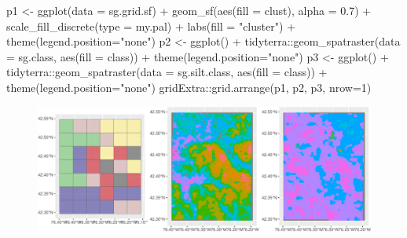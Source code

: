 \documentclass[
  letterpaper,
  DIV=11,
  numbers=noendperiod]{scrartcl}
\newenvironment{Shaded}{\begin{snugshade}}{\end{snugshade}}
\newcommand{\AttributeTok}[1]{\textcolor[rgb]{0.40,0.45,0.13}{#1}}
\newcommand{\DecValTok}[1]{\textcolor[rgb]{0.68,0.00,0.00}{#1}}
\newcommand{\FloatTok}[1]{\textcolor[rgb]{0.68,0.00,0.00}{#1}}
\newcommand{\FunctionTok}[1]{\textcolor[rgb]{0.28,0.35,0.67}{#1}}
\newcommand{\NormalTok}[1]{\textcolor[rgb]{0.00,0.23,0.31}{#1}}
\newcommand{\OtherTok}[1]{\textcolor[rgb]{0.00,0.23,0.31}{#1}}
\newcommand{\SpecialCharTok}[1]{\textcolor[rgb]{0.37,0.37,0.37}{#1}}
\newcommand{\StringTok}[1]{\textcolor[rgb]{0.13,0.47,0.30}{#1}}
\begin{document}
\begin{Shaded}
\begin{Highlighting}[]
\NormalTok{p1 }\OtherTok{\textless{}{-}} \FunctionTok{ggplot}\NormalTok{(}\AttributeTok{data =}\NormalTok{ sg.grid.sf) }\SpecialCharTok{+} 
  \FunctionTok{geom\_sf}\NormalTok{(}\FunctionTok{aes}\NormalTok{(}\AttributeTok{fill =}\NormalTok{ clust), }\AttributeTok{alpha =} \FloatTok{0.7}\NormalTok{) }\SpecialCharTok{+}
  \FunctionTok{scale\_fill\_discrete}\NormalTok{(}\AttributeTok{type =}\NormalTok{ my.pal) }\SpecialCharTok{+}
  \FunctionTok{labs}\NormalTok{(}\AttributeTok{fill =} \StringTok{"cluster"}\NormalTok{)  }\SpecialCharTok{+}
  \FunctionTok{theme}\NormalTok{(}\AttributeTok{legend.position=}\StringTok{"none"}\NormalTok{)}
\NormalTok{p2 }\OtherTok{\textless{}{-}} \FunctionTok{ggplot}\NormalTok{() }\SpecialCharTok{+}
\NormalTok{  tidyterra}\SpecialCharTok{::}\FunctionTok{geom\_spatraster}\NormalTok{(}\AttributeTok{data =}\NormalTok{ sg.class, }\FunctionTok{aes}\NormalTok{(}\AttributeTok{fill =}\NormalTok{ class)) }\SpecialCharTok{+}
   \FunctionTok{theme}\NormalTok{(}\AttributeTok{legend.position=}\StringTok{"none"}\NormalTok{)}
\NormalTok{p3 }\OtherTok{\textless{}{-}} \FunctionTok{ggplot}\NormalTok{() }\SpecialCharTok{+}
\NormalTok{  tidyterra}\SpecialCharTok{::}\FunctionTok{geom\_spatraster}\NormalTok{(}\AttributeTok{data =}\NormalTok{ sg.silt.class, }\FunctionTok{aes}\NormalTok{(}\AttributeTok{fill =}\NormalTok{ class)) }\SpecialCharTok{+}
   \FunctionTok{theme}\NormalTok{(}\AttributeTok{legend.position=}\StringTok{"none"}\NormalTok{)}
\NormalTok{gridExtra}\SpecialCharTok{::}\FunctionTok{grid.arrange}\NormalTok{(p1, p2, p3, }\AttributeTok{nrow=}\DecValTok{1}\NormalTok{)}
\end{Highlighting}
\end{Shaded}

\begin{figure}[H]

{\centering \includegraphics{PatternAnalysisWorkshopTutorial_files/figure-pdf/incove-clusters-map-3-1.pdf}

}

\end{figure}
\end{document}
